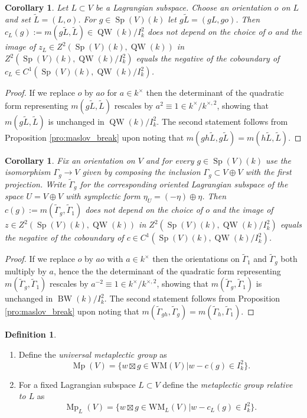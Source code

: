 \documentclass{article}
\DeclareMathOperator{\Sp}{Sp}
\newtheorem{cor}[thm]{Corollary}
\theoremstyle{definition}
\newtheorem{dfn}[thm]{Definition}
\numberwithin{equation}{subsection}
\renewcommand{\-}{\hyp{}}
\DeclareMathOperator{\Mp}{Mp}
\newcommand{\WMuniv}{\mathrm{WM}}
\DeclareMathOperator{\BW}{BW}
\DeclareMathOperator{\QW}{QW}
\begin{document}
\begin{appendices}
\begin{cor}
	Let $L \subset V$ be a Lagrangian subspace. Choose an orientation $o$ on $L$ and set $\tilde L=(L,o)$. For $g \in \Sp(V)(k)$ let $g\tilde L=(gL,go)$. Then $c_L(g) := m(g\tilde L,\tilde L) \in \QW(k)/I_k^2$ does not depend on the choice of $o$ and the image of $z_L \in Z^2(\Sp(V)(k),\QW(k))$ in $Z^2(\Sp(V)(k),\QW(k)/I_k^2)$ equals the negative of the coboundary of $c_L \in C^1(\Sp(V)(k),\QW(k)/I_k^2)$.
\end{cor}
\begin{proof}
	If we replace $o$ by $ao$ for $a \in k^\times$ then the determinant of the quadratic form representing $m(g\tilde L,\tilde L)$ rescales by $a^2 \equiv 1 \in k^\times/k^{\times,2}$, showing that $m(g\tilde L,\tilde L)$ is unchanged in $\QW(k)/I_k^2$. The second statement follows from Proposition \ref{pro:maslov_break} upon noting that $m(gh\tilde L,g\tilde L)=m(h\tilde L,\tilde L)$.
\end{proof}



\begin{cor} \label{cor:unisec}
	Fix an orientation on $V$ and for every $g \in \Sp(V)(k)$ use the isomorphism $\Gamma_g \to V$ given by composing the inclusion $\Gamma_g \subset V \oplus V$ with the first projection. Write $\tilde \Gamma_g$ for the corresponding oriented Lagrangian subspace of the space $U=V \oplus V$ with symplectic form $\eta_U=(-\eta) \oplus \eta$. Then $c(g):=m(\tilde\Gamma_g,\tilde\Gamma_1)$ does not depend on the choice of $o$ and the image of $z \in Z^2(\Sp(V)(k),\QW(k))$ in $Z^2(\Sp(V)(k),\QW(k)/I_k^2)$ equals the negative of the coboundary of $c \in C^1(\Sp(V)(k),\QW(k)/I_k^2)$.
\end{cor}
\begin{proof}
	If we replace $o$ by $ao$ with $a \in k^\times$ then the orientations on $\tilde \Gamma_1$ and $\tilde \Gamma_g$ both multiply by $a$, hence the the determinant of the quadratic form representing $m(\tilde \Gamma_g,\tilde\Gamma_1)$ rescales by $a^{-2} \equiv 1 \in k^\times/k^{\times,2}$, showing that $m(\tilde \Gamma_g,\tilde\Gamma_1)$ is unchanged in $\BW(k)/I_k^2$. The second statement follows from Proposition \ref{pro:maslov_break} upon noting that $m(\tilde \Gamma_{gh},\tilde\Gamma_{g})=m(\tilde \Gamma_h,\tilde\Gamma_1)$. \end{proof}


\begin{dfn}
\begin{enumerate}
	\item Define the \emph{universal metaplectic group} as 
	\[ \Mp(V) = \{w \boxtimes g \in \WMuniv(V)| w-c(g) \in I_k^2\}. \]
	\item For a fixed Lagrangian subspace $L \subset V$ define the \emph{metaplectic group relative to $L$} as
	\[ \Mp_L(V) = \{w \boxtimes g \in \WMuniv_L(V)| w-c_L(g) \in I_k^2 \}. \]
\end{enumerate}
\end{dfn}


\end{appendices}
\end{document}
